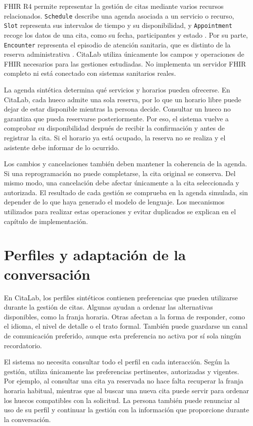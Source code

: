 FHIR R4 permite representar la gestión de citas mediante varios recursos relacionados. \texttt{Schedule} describe una agenda asociada a un servicio o recurso, \texttt{Slot} representa sus intervalos de tiempo y su disponibilidad, y \texttt{Appointment} recoge los datos de una cita, como su fecha, participantes y estado \citep{fhirAppointment,fhirR4,fhirSlot}. Por su parte, \texttt{Encounter} representa el episodio de atención sanitaria, que es distinto de la reserva administrativa \citep{fhirEncounter}. CitaLab utiliza únicamente los campos y operaciones de FHIR necesarios para las gestiones estudiadas. No implementa un servidor FHIR completo ni está conectado con sistemas sanitarios reales.

La agenda sintética determina qué servicios y horarios pueden ofrecerse. En CitaLab, cada hueco admite una sola reserva, por lo que un horario libre puede dejar de estar disponible mientras la persona decide. Consultar un hueco no garantiza que pueda reservarse posteriormente. Por eso, el sistema vuelve a comprobar su disponibilidad después de recibir la confirmación y antes de registrar la cita. Si el horario ya está ocupado, la reserva no se realiza y el asistente debe informar de lo ocurrido.

Los cambios y cancelaciones también deben mantener la coherencia de la agenda. Si una reprogramación no puede completarse, la cita original se conserva. Del mismo modo, una cancelación debe afectar únicamente a la cita seleccionada y autorizada. El resultado de cada gestión se comprueba en la agenda simulada, sin depender de lo que haya generado el modelo de lenguaje. Los mecanismos utilizados para realizar estas operaciones y evitar duplicados se explican en el capítulo de implementación.

\section{Perfiles y adaptación de la conversación}

En CitaLab, los perfiles sintéticos contienen preferencias que pueden utilizarse durante la gestión de citas. Algunas ayudan a ordenar las alternativas disponibles, como la franja horaria. Otras afectan a la forma de responder, como el idioma, el nivel de detalle o el trato formal. También puede guardarse un canal de comunicación preferido, aunque esta preferencia no activa por sí sola ningún recordatorio.

El sistema no necesita consultar todo el perfil en cada interacción. Según la gestión, utiliza únicamente las preferencias pertinentes, autorizadas y vigentes. Por ejemplo, al consultar una cita ya reservada no hace falta recuperar la franja horaria habitual, mientras que al buscar una nueva cita puede servir para ordenar los huecos compatibles con la solicitud. La persona también puede renunciar al uso de su perfil y continuar la gestión con la información que proporcione durante la conversación.

